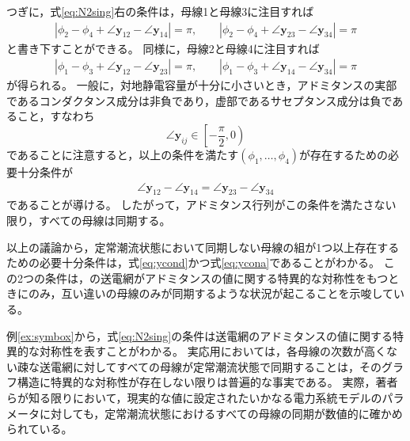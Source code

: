 \documentclass[tombow,dvipdfmx]{corona-a5-1.1}
\begin{document}
\begin{例}
つぎに，式\ref{eq:N2sing}右の条件は，母線1と母線3に注目すれば
\begin{align*}
|\phi_2 - \phi_4 + \angle \bm{y}_{12} - \angle \bm{y}_{14}|=\pi
,\qquad
|\phi_2 - \phi_4 + \angle \bm{y}_{23} - \angle \bm{y}_{34}|=\pi
\end{align*}
と書き下すことができる。
同様に，母線2と母線4に注目すれば
\begin{align*}
|\phi_1 - \phi_3 + \angle \bm{y}_{12} - \angle \bm{y}_{23}|=\pi
,\qquad
|\phi_1 - \phi_3 + \angle \bm{y}_{14} - \angle \bm{y}_{34}|=\pi
\end{align*}
が得られる。
一般に，対地静電容量が十分に小さいとき，アドミタンスの実部であるコンダクタンス成分は非負であり，虚部であるサセプタンス成分は負であること，すなわち
\[
\angle \bm{y}_{ij} \in \left[-\frac{\pi}{2},0 \right)
\]
であることに注意すると，以上の条件を満たす$(\phi_1,\ldots,\phi_4)$が存在するための必要十分条件が
\begin{align}\label{eq:ycona}
\angle \bm{y}_{12} - \angle \bm{y}_{14}=
\angle \bm{y}_{23} - \angle \bm{y}_{34}
\end{align}
であることが導ける。
したがって，アドミタンス行列がこの条件を満たさない限り，すべての母線は同期する。

以上の議論から，定常潮流状態において同期しない母線の組が1つ以上存在するための必要十分条件は，式\ref{eq:ycond}かつ式\ref{eq:ycona}であることがわかる。
この2つの条件は，の送電網がアドミタンスの値に関する特異的な対称性をもつときにのみ，互い違いの母線のみが同期するような状況が起こることを示唆している。
\end{例}

例\ref{ex:symbox}から，式\ref{eq:N2sing}の条件は送電網のアドミタンスの値に関する特異的な対称性を表すことがわかる。
実応用においては，各母線の次数が高くない疎な送電網に対してすべての母線が定常潮流状態で同期することは，そのグラフ構造に特異的な対称性が存在しない限りは普遍的な事実である。
実際，著者らが知る限りにおいて，現実的な値に設定されたいかなる電力系統モデルのパラメータに対しても，定常潮流状態におけるすべての母線の同期が数値的に確かめられている。
\end{document}
